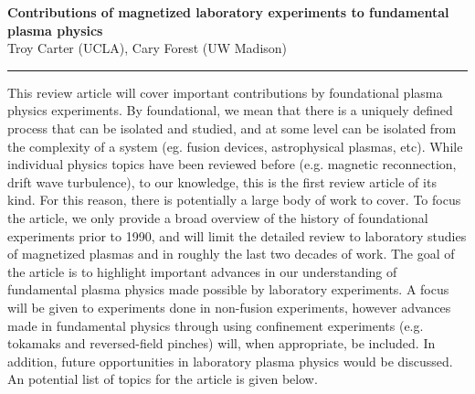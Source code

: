 \documentclass[12pt]{article}
\begin{document}
\begin{center}
{\Large{\bf Contributions of magnetized laboratory experiments to fundamental plasma physics}} \\[0.1truein]
Troy Carter (UCLA), Cary Forest (UW Madison)
\end{center}

\hrule


This review article will cover important contributions by foundational
plasma physics experiments.  By foundational, we mean that there is a 
uniquely defined process that can be isolated and studied, and at some level can be 
isolated from the complexity of a system (eg. fusion devices, astrophysical plasmas, etc).
While individual physics topics have been reviewed before (e.g. magnetic reconnection, drift
wave turbulence), to our knowledge, this is the first review article
of its kind.  For this reason, there is potentially a large body of
work to cover. To focus the article, we only provide a broad overview of the history of
foundational experiments prior to 1990, and will limit the detailed review to
laboratory studies of magnetized plasmas and in roughly the last
two decades of work. The goal of the article is
to highlight important advances in our understanding of fundamental
plasma physics made possible by laboratory experiments.  A focus will
be given to experiments done in non-fusion experiments, however
advances made in fundamental physics through using confinement
experiments (e.g. tokamaks and reversed-field pinches) will, when appropriate, be included.
In addition, future opportunities in laboratory plasma physics would be
discussed. An potential list of topics for the article is given below.





\end{document}
